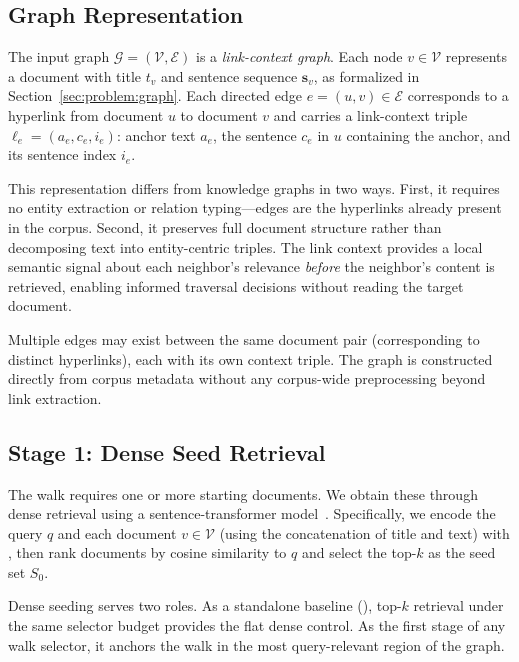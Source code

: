 \subsection{Graph Representation}
\label{sec:method:graph}

The input graph $\mathcal{G} = (\mathcal{V}, \mathcal{E})$ is a \emph{link-context graph}. Each node $v \in \mathcal{V}$ represents a document with title $t_v$ and sentence sequence $\mathbf{s}_v$, as formalized in Section~\ref{sec:problem:graph}. Each directed edge $e = (u, v) \in \mathcal{E}$ corresponds to a hyperlink from document $u$ to document $v$ and carries a link-context triple $\ell_e = (a_e, c_e, i_e)$: anchor text $a_e$, the sentence $c_e$ in $u$ containing the anchor, and its sentence index $i_e$.

This representation differs from knowledge graphs in two ways. First, it requires no entity extraction or relation typing---edges are the hyperlinks already present in the corpus. Second, it preserves full document structure rather than decomposing text into entity-centric triples. The link context provides a local semantic signal about each neighbor's relevance \emph{before} the neighbor's content is retrieved, enabling informed traversal decisions without reading the target document.

Multiple edges may exist between the same document pair (corresponding to distinct hyperlinks), each with its own context triple. The graph is constructed directly from corpus metadata without any corpus-wide preprocessing beyond link extraction.

\subsection{Stage 1: Dense Seed Retrieval}
\label{sec:method:seed}

The walk requires one or more starting documents. We obtain these through dense retrieval using a sentence-transformer model~\cite{reimers2019sentencebert}. Specifically, we encode the query $q$ and each document $v \in \mathcal{V}$ (using the concatenation of title and text) with \stmodel{}, then rank documents by cosine similarity to $q$ and select the top-$k$ as the seed set $S_0$.

Dense seeding serves two roles. As a standalone baseline (\seldense{}), top-$k$ retrieval under the same selector budget provides the flat dense control. As the first stage of any walk selector, it anchors the walk in the most query-relevant region of the graph.

